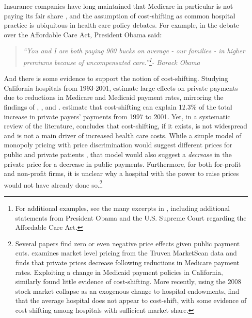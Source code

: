 \documentclass[12pt]{article}
\begin{document}
Insurance companies have long maintained that Medicare in particular is not paying its fair share \citep{frakt2011}, and the assumption of cost-shifting as common hospital practice is ubiquitous in health care policy debates. For example, in the debate over the Affordable Care Act, President Obama said:
\begin{quote}
\textit{``You and I are both paying 900 bucks on average - our families - in higher premiums because of uncompensated care.''\footnote{For additional examples, see the many excerpts in \cite{dranove2017}, including additional statements from President Obama and the U.S. Supreme Court regarding the Affordable Care Act.}- Barack Obama}
\end{quote}
And there is some evidence to support the notion of cost-shifting. Studying California hospitals from 1993-2001, \cite{zwanziger2006} estimate large effects on private payments due to reductions in Medicare and Medicaid payment rates, mirroring the findings of \cite{lee2003}, \cite{zwanziger2000}, and \cite{cutler1998costshift}. \cite{zwanziger2006} estimate that cost-shifting can explain 12.3\% of the total increase in private payers' payments from 1997 to 2001.  Yet, in a systematic review of the literature, \citet{frakt2011} concludes that cost-shifting, if it exists, is not widespread and is not a main driver of increased health care costs.   While a simple model of monopoly pricing with price discrimination would suggest different prices for public and private patients \citep{hay1983}, that model would also suggest a \textit{decrease} in the private price for a decrease in public payments.  Furthermore, for both for-profit and non-profit firms, it is unclear why a hospital with the power to raise prices would not have already done so.\footnote{Several papers find zero or even negative price effects given public payment cuts. \cite{white2013} examines market level pricing from the Truven MarketScan data and finds that private prices decrease following reductions in Medicare payment rates. Exploiting a change in Medicaid payment policies in California, \citet{dranove1998} similarly found little evidence of cost-shifting. More recently, using the 2008 stock market collapse as an exogenous change to hospital endowments, \cite{dranove2017} find that the average hospital does not appear to cost-shift, with some evidence of cost-shifting among hospitals with sufficient market share.}
\end{document}
